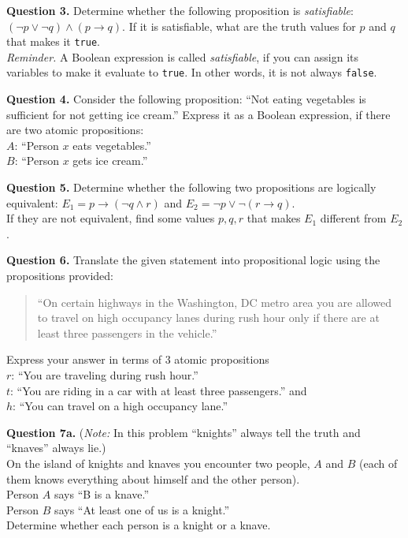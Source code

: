 \documentclass[jou]{apa6}
\begin{document}
\vspace{10pt}
{\bf Question 3.} Determine whether the following proposition is {\em satisfiable}:
$(\neg p \vee \neg q) \wedge (p \rightarrow q)$. If it is satisfiable, what are the 
truth values for $p$ and $q$ that makes it {\tt true}.\\
{\em Reminder.} A Boolean expression is called {\em satisfiable}, 
if you can assign its variables to make it evaluate to {\tt true}. In other words,
it is not always {\tt false}. 

\vspace{10pt}
{\bf Question 4.}
Consider the following proposition: ``Not eating vegetables is sufficient for not getting ice cream.''
Express it as a Boolean expression, if there are two atomic propositions:\\
$A$: ``Person $x$ eats vegetables.''\\
$B$: ``Person $x$ gets ice cream.''

\vspace{10pt}
{\bf Question 5.} 
Determine whether the following two propositions are logically equivalent:
$E_1 = p \rightarrow (\neg q \wedge r)$ and $E_2 = \neg p \vee \neg(r \rightarrow q)$.\\
If they are not equivalent, find some values $p,q,r$ that makes $E_1$ different 
from $E_2$.

\vspace{10pt}
{\bf Question 6.} 
Translate the given statement into propositional logic using the propositions provided:
\begin{quote}
``On certain highways in the Washington, DC metro area you are allowed to travel
on high occupancy lanes during rush hour only if there are at least three passengers in the vehicle.''
\end{quote}
Express your answer in terms of $3$ atomic propositions\\
$r$: ``You are traveling during rush hour.''\\
$t$: ``You are riding in a car with at least three passengers.'' and\\
$h$: ``You can travel on a high occupancy lane.''

\vspace{10pt}
{\bf Question 7a.} 
({\em Note:} In this problem ``knights'' always tell the truth and ``knaves'' always lie.)\\
On the island of knights and knaves you encounter two people, $A$ and $B$ (each of them knows
everything about himself and the other person).\\
Person $A$ says ``B is a knave.''\\
Person $B$ says ``At least one of us is a knight.''\\
Determine whether each person is a knight or a knave.
\end{document}
